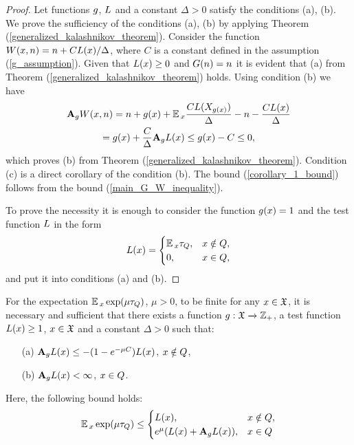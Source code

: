 	\begin{proof}
		Let functions $g$, $L$ and a constant $\Delta > 0$ satisfy the conditions (a), (b). We prove the sufficiency of the conditions (a), (b) by applying Theorem (\ref{generalized_kalashnikov_theorem}). Consider the function $W(x, n) = n + CL(x) / \Delta$, where $C$ is a constant defined in the assumption (\ref{g_assumption}). Given that $L(x) \geq 0$ and $G(n) = n$ it is evident that (a) from Theorem (\ref{generalized_kalashnikov_theorem}) holds. Using condition (b) we have
		\begin{gather*}
		\mathbf{A}_{g}W(x, n) = n + g(x) + \operatorname*{\mathbb{E}}{}_{x}\frac{CL(X_{g(x)})}{\Delta} - n - \frac{CL(x)}{\Delta} \\ = g(x) + \frac{C}{\Delta}\mathbf{A}_{g}L(x) \leq g(x) - C \leq 0,
		\end{gather*}
		which proves (b) from Theorem (\ref{generalized_kalashnikov_theorem}). Condition (c) is a direct corollary of the condition (b). The bound (\ref{corollary_1_bound}) follows from the bound (\ref{main_G_W_inequality}).
		
		To prove the necessity it is enough to consider the function $g(x) = 1$ and the test function $L$ in the form
		\begin{gather*}
		L(x) = \begin{cases}
		\operatorname*{\mathbb{E}}{}_{x}\tau_{Q}, & x \notin Q,\\
		0, & x \in Q,
		\end{cases}
		\end{gather*}
		and put it into conditions (a) and (b).
	\end{proof}
	
	\begin{repeated_corollary}
		For the expectation $\operatorname*{\mathbb{E}}{}_{x}\exp(\mu\tau_{Q})$, $\mu > 0$, to be finite for any $x \in \mathfrak{X}$, it is necessary and sufficient that there exists a function $g:\mathfrak{X} \xrightarrow{} \mathbb{Z}_{+}$, a test function $L(x) \geq 1$, $x \in \mathfrak{X}$ and a constant $\Delta > 0$ such that:
		\begin{enumerate}
			\item[(a)] $\mathbf{A}_{g}L(x) \leq -(1 - e^{-\mu C})L(x)$, $x \notin Q$,
			\item[(b)] $\mathbf{A}_{g}L(x) < \infty$, $x \in Q$.
		\end{enumerate}
		Here, the following bound holds:
		\begin{align}
		\operatorname*{\mathbb{E}}{}_{x}\exp(\mu\tau_{Q}) \leq \begin{cases}
		L(x), & x \notin Q, \\
		e^{\mu}(L(x) + \mathbf{A}_{g}L(x)), & x \in Q
		\end{cases}
		\label{corollary_2_bound}
		\end{align}
	\end{repeated_corollary}
	
